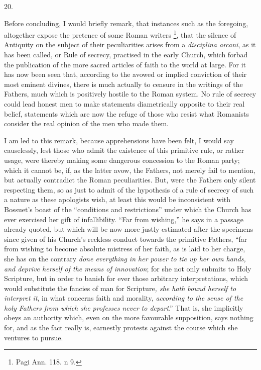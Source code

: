 20.

Before concluding, I would briefly remark, that instances such as
the foregoing, altogether expose the pretence of some Roman writers \footnote{Pagi Ann. 118. n 9.}, that the silence of Antiquity on the subject of their
peculiarities arises from a \emph{disciplina arcani}, as it has been
called, or Rule of secrecy, practised in the early Church, which
forbad the publication of the more sacred articles of faith to the
world at large. For it has now been seen that, according to the avowed
or implied conviction of their most eminent divines, there is much
actually to censure in the writings of the Fathers, much which is
positively hostile to the Roman system. No rule of secrecy could lead
honest men to make statements diametrically opposite to their
real belief, statements which are now the refuge of those who resist
what Romanists consider the real opinion of the men who made them.

I am led to this remark, because apprehensions have been felt, I
would say causelessly, lest those who admit the existence of this
primitive rule, or rather usage, were thereby making some dangerous
concession to the Roman party; which it cannot be, if, as the latter
avow, the Fathers, not merely fail to mention, but actually contradict
the Roman peculiarities. But, were the Fathers only silent respecting
them, so as just to admit of the hypothesis of a rule of secrecy of
such a nature as these apologists wish, at least this would be
inconsistent with Bossuet's boast of the ``conditions and
restrictions'' under which the Church has ever exercised her gift
of infallibility. ``Far from wishing,'' he says in a passage
already quoted, but which will be now more justly estimated after the
specimens since given of his Church's reckless conduct towards the
primitive Fathers, ``far from wishing to become absolute mistress
of her faith, as is laid to her charge, she has on the contrary \emph{done
everything in her power to tie up her own hands, and deprive herself
of the means of innovation}; for she not only submits to Holy
Scripture, but in order to banish for ever those arbitrary
interpretations, which would substitute the fancies of man for
Scripture\emph{, she hath bound herself to interpret it}, in what
concerns faith and morality, \emph{according to the sense of the holy
Fathers from which she professes never to depart}.'' That is,
she implicitly obeys an authority which, even on the more favourable
supposition, says nothing for, and as the fact really is, earnestly
protests against the course which she ventures to pursue.

